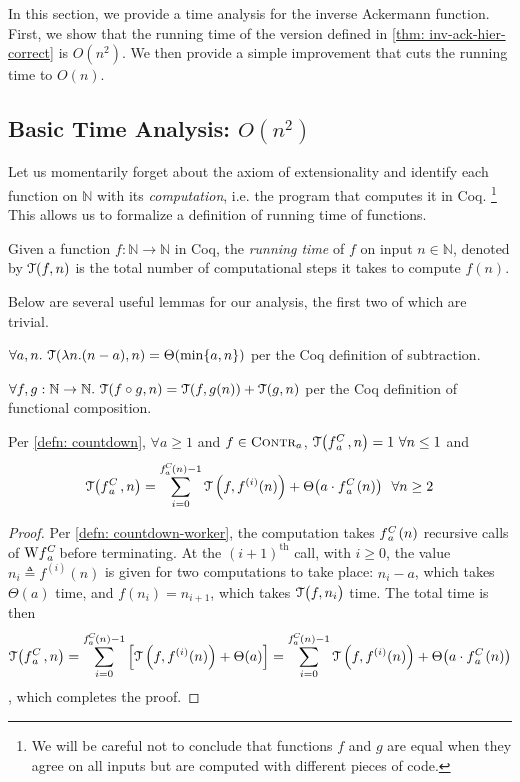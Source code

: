 In this section, we provide a time analysis for the 
inverse Ackermann function. First, we show that the 
running time of the version defined in \cref{thm: inv-ack-hier-correct}
is $O(n^2)$. We then provide a simple improvement that 
cuts the running time to $O(n)$.

\subsection{Basic Time Analysis: $O(n^2)$}
Let us momentarily forget about the axiom of extensionality and identify each 
function on $\mathbb{N}$ with its \emph{computation}, i.e. the program that 
computes it in Coq.
\footnote{We will be careful not to conclude that functions 
$f$ and $g$ are equal when they agree on all inputs but are computed with 
different pieces of code.} This allows us to formalize a definition of 
running time of functions.
\begin{defn}
	Given a function $f:\mathbb{N}\to\mathbb{N}$ in Coq, the \emph{running time} of $f$ on input $n\in \mathbb{N}$, denoted by $\mathcal{T}(f, n)$ is the total number of computational steps it takes to compute $f(n)$.
\end{defn}
Below are several useful lemmas for our analysis, the first two of which are trivial.
\begin{lem} \label{lem: sub-runtime}
	$\forall a, n.~ \mathcal{T}(\lambda n.(n - a), n) = \Theta(\min\{a, n\})$ per the Coq definition of subtraction.
\end{lem}
\begin{lem} \label{lem: compose-runtime}
	$\forall f, g: \mathbb{N}\to \mathbb{N}.~\mathcal{T}(f\circ g, n) = \mathcal{T}(f, g(n)) + \mathcal{T}(g, n)$ per the Coq definition of functional composition. 
\end{lem}
\begin{lem} \label{lem: cdt-runtime}
	Per \cref{defn: countdown}, $\forall a\ge 1$ and $f\in \text{\scshape{Contr}}_{a}$, $\runtime\big(\cdt{f}{a}\ , n\big) = 1 \ \forall n\le 1$ and
	\begin{equation*}
	\runtime\big(\cdt{f}{a}\ , n\big) = \sum_{i=0}^{\cdt{f}{a}(n) - 1} \runtime\left(f, f^{(i)}(n)\right) + \Theta\big(a\cdot \cdt{f}{a}(n)\big) \ \ \forall n\ge 2
	\end{equation*}
\end{lem}
\begin{proof}
	Per \cref{defn: countdown-worker}, the computation takes $\cdt{f}{a}(n)$ recursive calls of $\W\cdt{f}{a}$ before terminating. At the $(i+1)^{\text{th}}$ call, with $i\ge 0$, the value $n_i \triangleq f^{(i)}(n)$ is given for two computations to take place: $n_i - a$, which takes $\Theta(a)$ time, and $f(n_i) = n_{i+1}$, which takes $\mathcal{T}\big(f, n_i\big)$ time. The total time is then
	\begin{equation*}
	\runtime\big(\cdt{f}{a}\ , n\big)
	= \sum_{i=0}^{\cdt{f}{a}(n) - 1} \left[\runtime\left(f, f^{(i)}(n)\right) + \Theta(a)\right]
	= \sum_{i=0}^{\cdt{f}{a}(n) - 1} \runtime\left(f, f^{(i)}(n)\right) + \Theta\big(a\cdot \cdt{f}{a}(n)\big)
	\end{equation*}
	, which completes the proof.
\end{proof}
